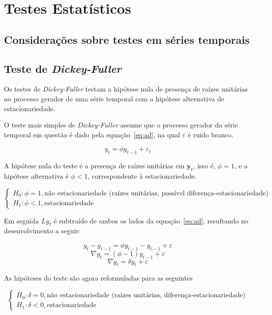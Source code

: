 \chapter{Testes Estatísticos}

\section{Considerações sobre testes em séries temporais}

\section{Teste de \emph{Dickey-Fuller}}

Os testes de \emph{Dickey-Fuller} testam a hipótese nula de presença de raízes
unitárias no processo gerador de uma série temporal com a hipótese alternativa
de estacionariedade.

O teste mais simples de \emph{Dickey-Fuller} assume que o processo gerador da
série temporal em questão é dado pela equação~\ref{eq:ad}, na qual
$\varepsilon$ é ruído branco.

\begin{equation}\label{eq:ad}
    y_t = \phi y_{t-1} + \varepsilon_t
\end{equation}

A hipótese nula do teste é a presença de raízes unitárias em $\mathbf{y}_t$,
isso é, $\phi = 1$, e a hipótese alternativa é $\phi < 1$, correspondente à
estacionariedade.

$$
\begin{cases}
    H_0: \phi = 1, \text{não estacionariedade (raízes unitárias, possível diferença-estacionariedade)} \\
    H_1: \phi < 1, \text{estacionariedade}
\end{cases}
$$

Em seguida $Ly_t$ é subtraído de ambos os lados da equação~\ref{eq:ad},
resultando no desenvolvimento a seguir:

$$ y_t - y_{t-1} = \phi y_{t-1} - y_{t-1} + \varepsilon $$
$$ \nabla y_t = (\phi - 1) y_{t-1}  + \varepsilon $$
$$ \nabla y_t = \delta y_t  + \varepsilon $$

As hipóteses do teste são agora reformuladas para as seguintes

$$
\begin{cases}
    H_0: \delta = 0, \text{não estacionariedade (raízes unitárias, diferença-estacionariedade)} \\
    H_1: \delta < 0, \text{estacionariedade}
\end{cases}
$$


